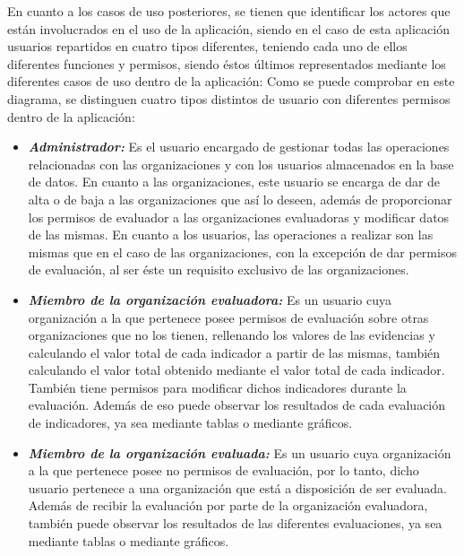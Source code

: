 	En cuanto a los casos de uso posteriores, se tienen que identificar los
    actores que están involucrados en el uso de la aplicación, siendo en el caso
    de esta aplicación usuarios repartidos en cuatro tipos diferentes,
    teniendo cada uno de ellos diferentes funciones y permisos, siendo éstos
    últimos representados mediante los diferentes casos de uso dentro de la
    aplicación:
    Como se puede comprobar en este diagrama, se distinguen cuatro tipos
    distintos de usuario con diferentes permisos dentro de la aplicación:
    \begin{itemize}
        \item \textit{\textbf{Administrador:}} Es el usuario encargado de
        gestionar todas las operaciones relacionadas con las organizaciones y
        con los usuarios almacenados en la base de datos. En cuanto a las
        organizaciones, este usuario se encarga de dar de alta o de baja a las
        organizaciones que así lo deseen, además de proporcionar los permisos de
        evaluador a las organizaciones evaluadoras y modificar datos de las
        mismas. En cuanto a los usuarios, las operaciones a realizar son las
        mismas que en el caso de las organizaciones, con la excepción de dar
        permisos de evaluación, al ser éste un requisito exclusivo de las
        organizaciones.
        \item \textit{\textbf{Miembro de la organización evaluadora: }}Es un
        usuario cuya organización a la que pertenece posee permisos de
        evaluación sobre otras organizaciones que no los tienen, rellenando los
        valores de las evidencias y calculando el valor total de cada indicador
        a partir de las mismas, también calculando el valor total obtenido
        mediante el valor total de cada indicador. También tiene permisos para
        modificar dichos indicadores durante la evaluación. Además de eso puede
        observar los resultados de cada evaluación de indicadores, ya sea
        mediante tablas o mediante gráficos. 
        \item \textit{\textbf{Miembro de la organización evaluada: }}Es un
        usuario cuya organización a la que pertenece posee no permisos de
        evaluación, por lo tanto, dicho usuario pertenece a una organización que
        está a disposición de ser evaluada. Además de recibir la evaluación por
        parte de la organización evaluadora, también puede observar los
        resultados de las diferentes evaluaciones, ya sea mediante tablas o
        mediante gráficos.
    \end{itemize}

